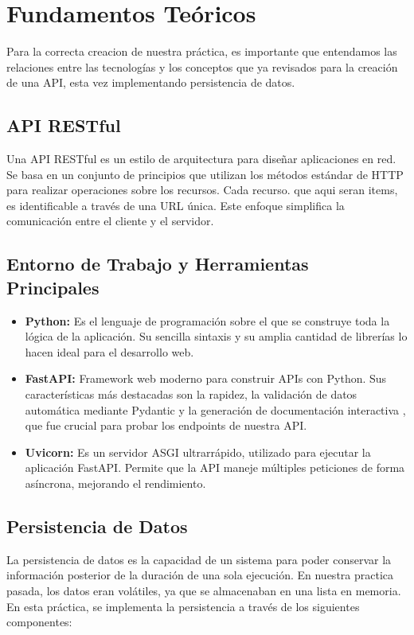\documentclass[12pt]{article}
\begin{document}
\section{Fundamentos Teóricos}

Para la correcta creacion de nuestra práctica, es importante que entendamos las relaciones entre las tecnologías y los conceptos que ya revisados para la creación de una API, esta vez implementando persistencia de datos.

\subsection*{API RESTful}
Una API RESTful es un estilo de arquitectura para diseñar aplicaciones en red. Se basa en un conjunto de principios que utilizan los métodos estándar de HTTP para realizar operaciones sobre los recursos. Cada recurso. que aqui seran items, es identificable a través de una URL única. Este enfoque simplifica la comunicación entre el cliente y el servidor.\cite{ref1}

\subsection*{Entorno de Trabajo y Herramientas Principales}
\begin{itemize}
    \item \textbf{Python:} Es el lenguaje de programación sobre el que se construye toda la lógica de la aplicación. Su sencilla sintaxis y su amplia cantidad de librerías lo hacen ideal para el desarrollo web.\cite{ref2}
    \item \textbf{FastAPI:} Framework web moderno para construir APIs con Python. Sus características más destacadas son la rapidez, la validación de datos automática mediante Pydantic y la generación de documentación interactiva , que fue crucial para probar los endpoints de nuestra API.
    \item \textbf{Uvicorn:} Es un servidor ASGI ultrarrápido, utilizado para ejecutar la aplicación FastAPI. Permite que la API maneje múltiples peticiones de forma asíncrona, mejorando el rendimiento.\cite{ref3}
\end{itemize}

\subsection*{Persistencia de Datos}
La persistencia de datos es la capacidad de un sistema para poder conservar la información posterior de la duración de una sola ejecución. En nuestra practica pasada, los datos eran volátiles, ya que se almacenaban en una lista en memoria. En esta práctica, se implementa la persistencia a través de los siguientes componentes:
\end{document}
